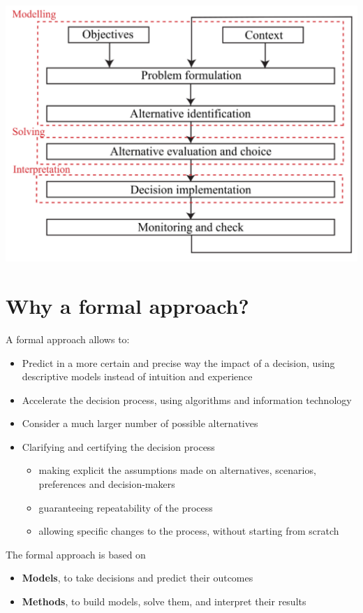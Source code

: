 \begin{center}
	\includegraphics[width=0.75\columnwidth]{img/intro/decisionIter}
\end{center}

\section{Why a formal approach?}

A formal approach allows to: 
\begin{itemize}
	\item Predict in a more certain and precise way the impact of a decision, using descriptive models instead of intuition and experience
	
	\item Accelerate the decision process, using algorithms and information technology
	
	\item Consider a much larger number of possible alternatives
	
	\item Clarifying and certifying the decision process
	\begin{itemize}
		\item making explicit the assumptions made on alternatives, scenarios, preferences and decision-makers
		
		\item guaranteeing repeatability of the process 
		
		\item allowing specific changes to the process, without starting from scratch
	\end{itemize}
\end{itemize}

The formal approach is based on
\begin{itemize}
	\item \textbf{Models}, to take decisions and predict their outcomes
	
	\item \textbf{Methods}, to build models, solve them, and interpret their results
\end{itemize}

